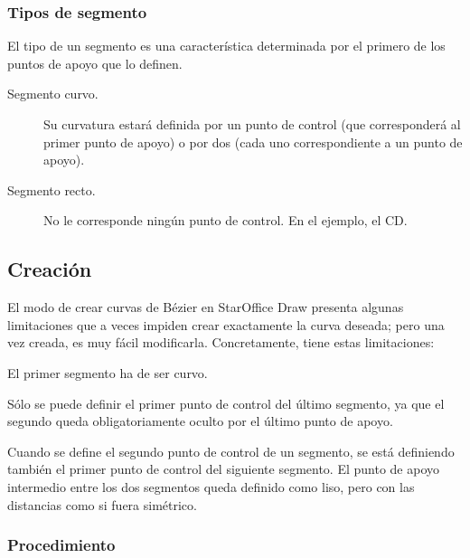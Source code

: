 \subsubsection{Tipos de segmento}

El tipo de un segmento es una característica determinada por el
primero de los puntos de apoyo que lo definen.

\begin{description}
\item[Segmento curvo.] Su curvatura estará definida por un punto 
de control (que corresponderá al primer punto de apoyo) o por 
dos (cada uno correspondiente a un punto de apoyo).

\item[Segmento recto.] No le corresponde ningún punto de control. 
En el ejemplo, el CD.
\end{description}

\subsection{Creación}

El modo de crear curvas de Bézier en StarOffice Draw presenta algunas
limitaciones que a veces impiden crear exactamente la curva deseada;
pero una vez creada, es muy fácil modificarla. Concretamente, tiene
estas limitaciones:

El primer segmento ha de ser curvo.

Sólo se puede definir el primer punto de control del último segmento,
ya que el segundo queda obligatoriamente oculto por el último punto de
apoyo.

Cuando se define el segundo punto de control de un segmento, se está
definiendo también el primer punto de control del siguiente
segmento. El punto de apoyo intermedio entre los dos segmentos queda
definido como liso, pero con las distancias como si fuera simétrico.

\subsubsection{Procedimiento}

